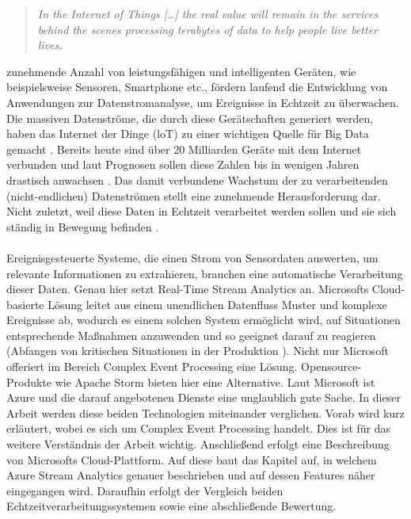 
\begin{quote} \textit{\glqq In the Internet of Things […] the real value will remain in the services behind the scenes processing terabytes of data to help people live better lives. \grqq~}\cite{Floarea.2014}\\ \end{quote} 

 zunehmende Anzahl von leistungsfähigen und intelligenten Geräten, wie beispielsweise Sensoren, Smartphone etc., fördern laufend die Entwicklung von Anwendungen zur Datenstromanalyse, um Ereignisse in Echtzeit zu überwachen. Die massiven Datenströme, die durch diese Gerätschaften generiert werden, haben das Internet der Dinge (loT) zu einer wichtigen Quelle für Big Data gemacht \cite{Prosise.}. Bereits heute sind über 20 Milliarden Geräte mit dem Internet verbunden und laut Prognosen sollen diese Zahlen bis in wenigen Jahren drastisch anwachsen \cite{Statista.2017}. Das damit verbundene Wachstum der zu verarbeitenden (nicht-endlichen) Datenströmen stellt eine zunehmende Herausforderung dar. Nicht zuletzt, weil diese Daten in Echtzeit verarbeitet werden sollen und sie sich ständig in Bewegung befinden \cite{Prosise.}.\\ \\ Ereignisgesteuerte Systeme, die einen Strom von Sensordaten auswerten, um relevante Informationen zu extrahieren, brauchen eine automatische Verarbeitung dieser Daten. Genau hier setzt Real-Time Stream Analytics an. Microsofts Cloud-basierte Lösung leitet aus einem unendlichen Datenfluss Muster und komplexe Ereignisse ab, wodurch es einem solchen System ermöglicht wird, auf Situationen entsprechende Maßnahmen anzuwenden und so geeignet darauf zu reagieren (Abfangen von kritischen Situationen in der Produktion \cite{rcrwireless.2016}). Nicht nur Microsoft offeriert im Bereich Complex Event Processing eine Lösung. Opensource-Produkte wie Apache Storm bieten hier eine Alternative. Laut Microsoft ist Azure und die darauf angebotenen Dienste eine unglaublich gute Sache. In dieser Arbeit werden diese beiden Technologien miteinander verglichen. Vorab wird kurz erläutert, wobei es sich um Complex Event Processing handelt. Dies ist für das weitere Verständnis der Arbeit wichtig. Anschließend erfolgt eine Beschreibung von Microsofts Cloud-Plattform. Auf diese baut das Kapitel auf, in welchem Azure Stream Analytics genauer beschrieben und auf dessen Features näher eingegangen wird. Daraufhin erfolgt der Vergleich beiden Echtzeitverarbeitungssystemen sowie eine abschließende Bewertung. 